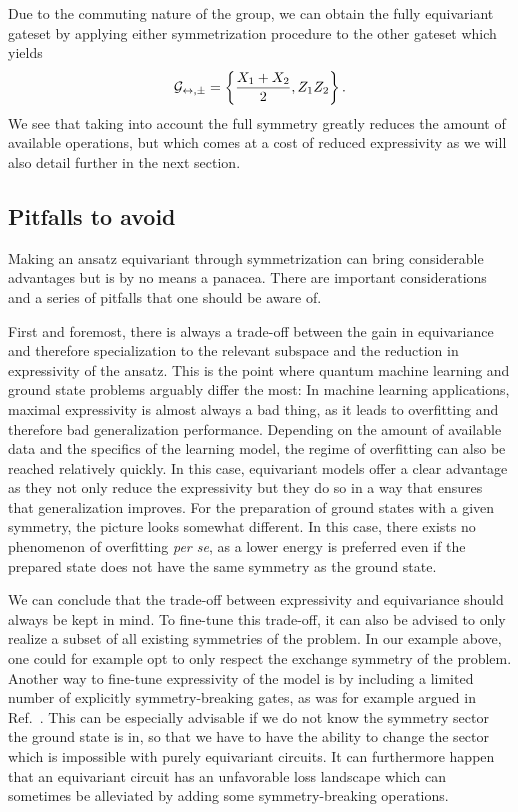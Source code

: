 \documentclass[a4paper,twocolumn,notitlepage,nofootinbib,superscriptaddress,floatfix]{revtex4-2}
\begin{document}
Due to the commuting nature of the group, we can obtain the fully equivariant gateset by applying either symmetrization procedure to the other gateset which yields
\begin{align}
    \mathcal{G}_{\leftrightarrow , \pm} = \left\{\frac{X_1 + X_2}{2}, Z_1 Z_2 \right\}.
\end{align}
We see that taking into account the full symmetry greatly reduces the amount of available operations, but which comes at a cost of reduced expressivity as we will also detail further in the next section.

\subsection*{Pitfalls to avoid}

Making an ansatz equivariant through symmetrization can bring considerable advantages but is by no means a panacea. There are important considerations and a series of pitfalls that one should be aware of. 

First and foremost, there is always a trade-off between the gain in equivariance and therefore specialization to the relevant subspace and the reduction in expressivity of the ansatz. This is the point where quantum machine learning and ground state problems arguably differ the most: In machine learning applications, maximal expressivity is almost always a bad thing, as it leads to overfitting and therefore bad generalization performance. Depending on the amount of available data and the specifics of the learning model, the regime of overfitting can also be reached relatively quickly. In this case, equivariant models offer a clear advantage as they not only reduce the expressivity but they do so in a way that ensures that generalization improves. 
For the preparation of ground states with a given symmetry, the picture looks somewhat different. In this case, there exists no phenomenon of overfitting \emph{per se}, as a lower energy is preferred even if the prepared state does not have the same symmetry as the ground state. 

We can conclude that the trade-off between expressivity and equivariance should always be kept in mind. To fine-tune this trade-off, it can also be advised to only realize a subset of all existing symmetries of the problem. In our example above, one could for example opt to only respect the exchange symmetry of the problem. Another way to fine-tune expressivity of the model is by including a limited number of explicitly symmetry-breaking gates, as was for example argued in Ref.~\cite{ParkBrokenSymm}. This can be especially advisable if we do not know the symmetry sector the ground state is in, so that we have to have the ability to change the sector which is impossible with purely equivariant circuits. It can furthermore happen that an equivariant circuit has an unfavorable loss landscape which can sometimes be alleviated by adding some symmetry-breaking operations.
\end{document}
